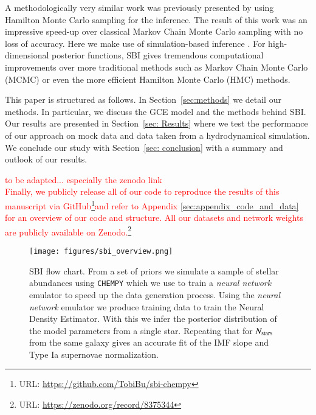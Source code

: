 \documentclass{aa}
\begin{document}
A methodologically very similar work was previously presented by \cite{Philcox_2019} using Hamilton Monte Carlo sampling for the inference. The result of this work was an impressive speed-up over classical Markov Chain Monte Carlo sampling with no loss of accuracy. Here we make use of simulation-based inference \citep[SBI, e.g.][]{Cranmer2020}. For high-dimensional posterior functions, SBI gives tremendous computational improvements over more traditional methods such as Markov Chain Monte Carlo (MCMC) or even the more efficient Hamilton Monte Carlo (HMC) methods. 

This paper is structured as follows. In Section~\ref{sec:methods} we detail our methods. In particular, we discuss the GCE model and the methods behind SBI. Our results are presented in Section~\ref{sec: Results} where we test the performance of our approach on mock data and data taken from a hydrodynamical simulation. We conclude our study with Section~\ref{sec: conclusion} with a summary and outlook of our results.

\textcolor{red}{to be adapted... especially the zenodo link\\
Finally, we publicly release all of our code to reproduce the results of this manuscript via GitHub\footnote{URL: {\url{https://github.com/TobiBu/sbi-chempy}}}and refer to Appendix \ref{sec:appendix_code_and_data} for an overview of our code and structure. All our datasets and network weights are publicly available on Zenodo.\footnote{URL: \url{https://zenodo.org/record/8375344}}}

\begin{figure*}[]
     \centering
     \texttt{[image: figures/sbi\_overview.png]}
     \vspace{-.5cm}
     \caption{SBI flow chart. From a set of priors we simulate a sample of stellar abundances using \texttt{CHEMPY} \citep{Rybizki_2017,Philcox_2019} which we use to train a \emph{neural network} emulator to speed up the data generation process. Using the \emph{neural network} emulator we produce training data to train the Neural Density Estimator. With this we infer the posterior distribution of the model parameters from a single star. Repeating that for $N_{\rm stars}$ from the same galaxy gives an accurate fit of the IMF slope and Type Ia supernovae normalization.}
     \label{fig:flowchart}
\end{figure*}

\end{document}
